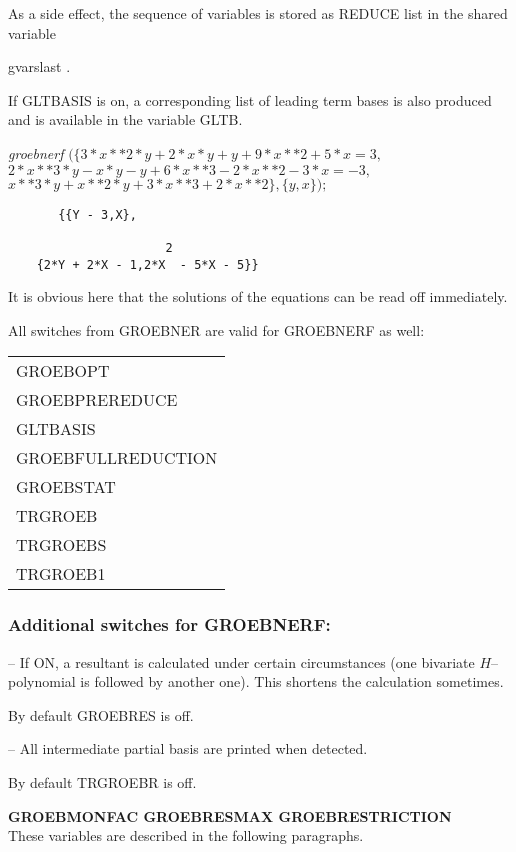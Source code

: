 As a side effect, the sequence of variables is stored as REDUCE list in
the shared variable
\begin{center}
gvarslast .
\end{center}
If GLTBASIS is on, a corresponding list of leading term bases is
also produced and is available in the variable GLTB.

\example {}

{\it groebnerf} $(\{ 3*x**2*y + 2*x*y + y + 9*x**2 + 5*x = 3,$  \\
\hspace*{+1cm} $ 2*x**3*y - x*y - y + 6*x**3 - 2*x**2 - 3*x = -3, $\\
\hspace*{+1cm} $ x**3*y + x**2*y + 3*x**3 + 2*x**2 \}, \{y,x\});$

\begin{verbatim}
       {{Y - 3,X},

                      2
    {2*Y + 2*X - 1,2*X  - 5*X - 5}}
\end{verbatim}

It is obvious here that the solutions of the equations can be read
off immediately.

All switches from GROEBNER are valid for GROEBNERF as well:
  
  
 
\begin{center}
\begin{tabular}{l}
GROEBOPT \\
GROEBPREREDUCE \\
GLTBASIS \\
GROEBFULLREDUCTION \\
GROEBSTAT \\
TRGROEB \\
TRGROEBS \\
TRGROEB1
\end{tabular}
\end{center}

\subsubsection*{Additional switches for GROEBNERF:}
\begin{description}
\item[GROEBRES] -- If ON, a resultant is calculated under certain
circumstances (one bivariate $H$--polynomial is followed by another
one). This shortens the calculation sometimes.

By default GROEBRES is off.

\item[TRGROEBR] -- All intermediate partial basis are printed when
detected.

By default TRGROEBR is off.
\end{description}
{\bf GROEBMONFAC  GROEBRESMAX  GROEBRESTRICTION} \\
\hspace*{.5cm} These variables are described in the following
paragraphs.

